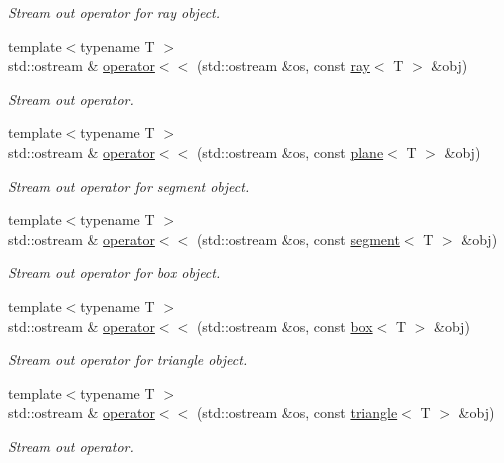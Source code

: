 \begin{DoxyCompactItemize}
\begin{DoxyCompactList}\small\item\em Stream out operator for ray object. \end{DoxyCompactList}\item 
{\footnotesize template$<$typename T $>$ }\\std\+::ostream \& \hyperlink{namespaceddd_ae2604d6c72853dfb2595f6882cbc7a51}{operator$<$$<$} (std\+::ostream \&os, const \hyperlink{classddd_1_1ray}{ray}$<$ T $>$ \&obj)
\begin{DoxyCompactList}\small\item\em Stream out operator. \end{DoxyCompactList}\item 
{\footnotesize template$<$typename T $>$ }\\std\+::ostream \& \hyperlink{namespaceddd_af1faa02295670c7cfd7f0278e3973f84}{operator$<$$<$} (std\+::ostream \&os, const \hyperlink{classddd_1_1plane}{plane}$<$ T $>$ \&obj)
\begin{DoxyCompactList}\small\item\em Stream out operator for segment object. \end{DoxyCompactList}\item 
{\footnotesize template$<$typename T $>$ }\\std\+::ostream \& \hyperlink{namespaceddd_a59e2fa950fd945aa8b3dd550720ad3f5}{operator$<$$<$} (std\+::ostream \&os, const \hyperlink{classddd_1_1segment}{segment}$<$ T $>$ \&obj)
\begin{DoxyCompactList}\small\item\em Stream out operator for box object. \end{DoxyCompactList}\item 
{\footnotesize template$<$typename T $>$ }\\std\+::ostream \& \hyperlink{namespaceddd_af710b0f11be50190553c743ce86545a3}{operator$<$$<$} (std\+::ostream \&os, const \hyperlink{classddd_1_1box}{box}$<$ T $>$ \&obj)
\begin{DoxyCompactList}\small\item\em Stream out operator for triangle object. \end{DoxyCompactList}\item 
{\footnotesize template$<$typename T $>$ }\\std\+::ostream \& \hyperlink{namespaceddd_a3a6f828f85e4fa306f0d950f1aab4f64}{operator$<$$<$} (std\+::ostream \&os, const \hyperlink{classddd_1_1triangle}{triangle}$<$ T $>$ \&obj)
\begin{DoxyCompactList}\small\item\em Stream out operator. \end{DoxyCompactList}\item 

\end{DoxyCompactItemize}
